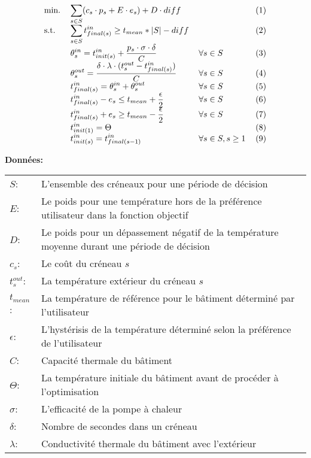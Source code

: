 \documentclass{article}
\begin{document}





\begin{align*}
\begin{tabular}{llll}
min. & $\displaystyle{\sum_{s \in S}(c_s \cdot p_s + E \cdot e_s) + D \cdot diff}$  &  & (1) \\
{s.t.} & $\displaystyle{\sum_{s \in S} t^{in}_{final(s)} \ge t_{mean}*|S| - diff}$ &  & (2) \\
& $\displaystyle{ \theta_{s}^{in} = t^{in}_{init(s)} + \frac{p_s \cdot \sigma \cdot \delta}{C}}$ & $\displaystyle{ \forall s \in S}$ & (3) \\
& $\displaystyle{\theta_{s}^{out} = \frac{\delta \cdot \lambda \cdot (t^{out}_s - t^{in}_{final(s)})}{C}}$ &  $\displaystyle{ \forall s \in S}$ & (4) \\
& $\displaystyle{t^{in}_{final(s)} = \theta^{in}_s + \theta^{out}_s}$ & $\displaystyle{ \forall s \in S}$ & (5) \\
& $\displaystyle{t^{in}_{final(s)} - e_s \le t_{mean} + \frac{\epsilon}{2}}$ & $\displaystyle{ \forall s \in S}$ & (6) \\
& $\displaystyle{t^{in}_{final(s)} + e_s \ge t_{mean} - \frac{\epsilon}{2}}$ & $\displaystyle{ \forall s \in S}$ & (7) \\
& $\displaystyle{t^{in}_{init(1)}} = \Theta$ & & (8) \\
& $\displaystyle{t^{in}_{init(s)} = t^{in}_{final(s-1)}}$ & $\displaystyle{ \forall s \in S, s \ge 1}$ & (9) \\
\end{tabular}
\end{align*}

\noindent
\textbf{Données:} \\
\begin{tabular}{ l p{} }
$S$: & L'ensemble des créneaux pour une période de décision \\
$E$: & Le poids pour une température hors de la préférence utilisateur dans la fonction objectif \\
$D$: & Le poids pour un dépassement négatif de la température moyenne durant une période de décision \\
$c_s$: & Le coût du créneau $s$ \\
$t^{out}_{s}$: & La température extérieur du créneau $s$\\
$t_{mean}$: & La température de référence pour le bâtiment déterminé par l'utilisateur \\
$\epsilon$: & L'hystérisis de la température déterminé selon la préférence de l'utilisateur\\
$C$: & Capacité thermale du bâtiment \\
$\Theta$: & La température initiale du bâtiment avant de procéder à l'optimisation \\
$\sigma$: & L'efficacité de la pompe à chaleur \\
$\delta$: & Nombre de secondes dans un créneau \\
$\lambda$: & Conductivité thermale du bâtiment avec l'extérieur \\
\end{tabular} 
\vspace{0.3cm}
\end{document}
